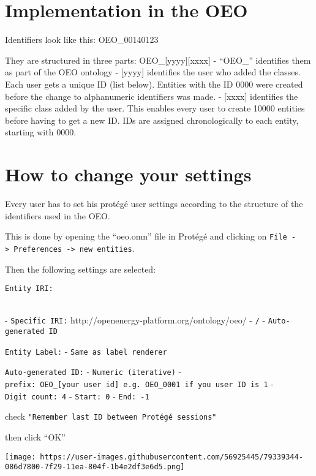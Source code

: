 \hypertarget{implementation-in-the-oeo}{%
\section{Implementation in the OEO}\label{implementation-in-the-oeo}}

Identifiers look like this: OEO\_00140123

They are structured in three parts: OEO\_{[}yyyy{]}{[}xxxx{]} -
``OEO\_'' identifies them as part of the OEO ontology - {[}yyyy{]}
identifies the user who added the classes. Each user gets a unique ID
(list below). Entities with the ID 0000 were created before the change
to alphanumeric identifiers was made. - {[}xxxx{]} identifies the
specific class added by the user. This enables every user to create
10000 entities before having to get a new ID. IDs are assigned
chronologically to each entity, starting with 0000.

\hypertarget{how-to-change-your-settings}{%
\section{How to change your
settings}\label{how-to-change-your-settings}}

Every user has to set his protégé user settings according to the
structure of the identifiers used in the OEO.

This is done by opening the ``oeo.omn'' file in Protégé and clicking on
\texttt{File\ -\textgreater{}\ Preferences\ -\textgreater{}\ new\ entities}.

Then the following settings are selected:

\texttt{Entity\ IRI:}\strut \\
- \texttt{Specific\ IRI:} http://openenergy-platform.org/ontology/oeo/ -
\texttt{/} - \texttt{Auto-generated\ ID}

\texttt{Entity\ Label:} - \texttt{Same\ as\ label\ renderer}

\texttt{Auto-generated\ ID:} - \texttt{Numeric\ (iterative)} -
\texttt{prefix:\ OEO\_{[}your\ user\ id{]}\ e.g.\ OEO\_0001\ if\ you\ user\ ID\ is\ 1}
- \texttt{Digit\ count:\ 4} - \texttt{Start:\ 0} - \texttt{End:\ -1}

check \texttt{"Remember\ last\ ID\ between\ Protégé\ sessions"}

then click ``OK''

\texttt{[image: https://user-images.githubusercontent.com/56925445/79339344-086d7800-7f29-11ea-804f-1b4e2df3e6d5.png]}
